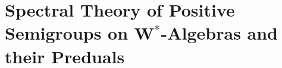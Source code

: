 \setcounter{chapter}{2}
\chapter{Spectral Theory of Positive Semigroups on 
\texorpdfstring{W$^{*}$-Algebras}{W*-Algebras} and their Preduals}\label{chap:d3}



%
%